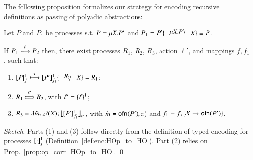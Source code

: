 
The following proposition formalizes our strategy  for encoding
recursive definitions as passing of polyadic abstractions:
%
\begin{proposition}\rm
	\label{prop:op_corr_HOprec_to_HO}
	Let $P$ and $P_1$ be \HOp processes s.t. 
	$P =\mu X. P'$ and
	$P_1 = P'\subst{\recp{X}{P'}}{\varp{X}} \scong P$.

	\noi If $P_1 \stackrel{\ell}{\longmapsto} P_2$ then,  there exist
	processes $R_1$, $R_2$,  $R_3$, action $\ell'$,
	and mappings $f, f_1$, such that: 
	\begin{enumerate}[1.]
	\item $\pmapp{P}{1}{f} \hby{\tau} \map{P'}^{1}_{f_{1}} \subst{R_3}{X} = R_1$;
	\item $R_1 \Hby{\ell'} R_2$, with $\ell' = \{\!\!\{\ell\}\!\!\}^{1}$;
	\item $R_3 = \abs{\tilde{m}}\binp{z}{X}\auxmap{\map{P'}^{1}_{f_{1}}}{\sigma}$, with $\tilde{m} = \mathsf{ofn}(P'),z$)
	and
	$f_1 = f, \{\mathcal{X} \to \mathsf{ofn}(P')\}$.
	\end{enumerate}
\end{proposition}

\begin{proof}[Sketch]
	Parts (1) and (3) follow directly from the definition of typed encoding for processes $[\!\![\cdot]\!\!]^{1}_{f}$
	(Definition~\ref{def:enc:HOp_to_HO}).
	Part (2) relies on  Prop.~\ref{prop:op_corr_HOp_to_HO}.
	\qed
\end{proof}




